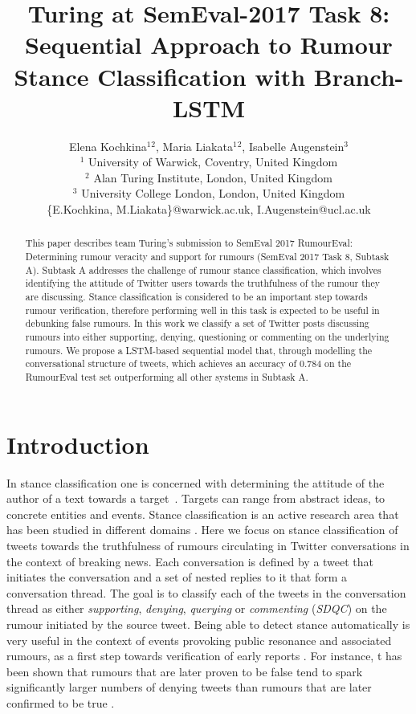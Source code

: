 \documentclass[11pt,a4paper]{article}
\title{Turing at SemEval-2017 Task 8: Sequential Approach to Rumour Stance Classification with Branch-LSTM}
\author{
	Elena Kochkina$^1$$^2$, Maria Liakata$^1$$^2$, Isabelle Augenstein$^3$\\
	$^1$ University of Warwick, Coventry, United Kingdom\\
	$^2$ Alan Turing Institute, London, United Kingdom\\
	$^3$ University College London, London, United Kingdom\\
	\{E.Kochkina, M.Liakata\}@warwick.ac.uk, I.Augenstein@ucl.ac.uk
}
\date{}
\begin{document}
\maketitle

\begin{abstract}
This paper describes team Turing's submission to SemEval 2017 RumourEval: Determining rumour veracity and support for rumours (SemEval 2017 Task 8, Subtask A). Subtask A addresses the challenge of rumour stance classification, which involves identifying the attitude of Twitter users towards the truthfulness of the rumour they are discussing. Stance classification is considered to be an important step towards rumour verification, therefore performing well in this task is expected to be useful in debunking false rumours. In this work we classify a set of Twitter posts discussing rumours into either supporting, denying, questioning or commenting on the underlying rumours. We propose a LSTM-based sequential model that, through modelling the conversational structure of tweets, which achieves an accuracy of 0.784 on the RumourEval test set outperforming all other systems in Subtask A. 
\end{abstract}

\section{Introduction}
In stance classification one is concerned with determining the attitude of the author of a text towards a target~\cite{mohammad2016semeval}. Targets can range from abstract ideas, to concrete entities and events. Stance classification is an active research area that has been studied in different domains \cite{ranade2013stance,chuang2015stance}.
Here we focus on stance classification of tweets towards the truthfulness of rumours circulating in Twitter conversations in the context of breaking news. Each conversation is defined by a tweet that initiates the conversation and a set of nested replies to it that form a conversation thread. The goal is to classify each of the tweets in the conversation thread as either \textit{supporting}, \textit{denying}, \textit{querying} or \textit{commenting} (\textit{SDQC}) on the rumour initiated by the source tweet. Being able to detect stance automatically is very useful in the context of events provoking public resonance and associated rumours, as a first step towards verification of early reports \cite{zhao2015enquiring}. For instance, t has been shown that rumours that are later proven to be false tend to spark significantly larger numbers of denying tweets than rumours that are later confirmed to be true \cite{mendoza2010twitter,procter2013readinga,derczynski2014pheme,zubiaga2016analysing}. 
\end{document}
